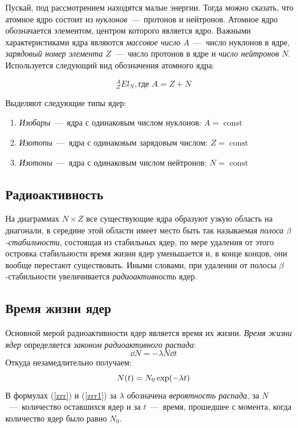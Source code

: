 \documentclass[titlepage]{article}
\DeclareMathOperator\const{const}
\begin{document}
\par
Пускай, под рассмотрением находятся малые энергии. Тогда можно сказать, что атомное ядро состоит из \emph{нуклонов}~\----~протонов и нейтронов. Атомное ядро обозначается элементом, центром которого является ядро. Важными характеристиками ядра являются \emph{массовое число} $A$~\----~число нуклонов в ядре, \emph{зарядовый номер элемента} $Z$~\----~число протонов в ядре и \emph{число нейтронов} $N$. Используется следующий вид обозначения атомного ядра:

\begin{equation}
 {}^{A}_{Z} El_N, \text{где } A = Z + N
\end{equation}

Выделяют следующие типы ядер:
\begin{enumerate}
 \item \emph{Изобары}~\----~ядра с одинаковым числом нуклонов:
 $
 A = \const
 $
 \item \emph{Изотопы}~\----~ядра с одинаковым зарядовым числом:
 $
 Z = \const
 $
 \item \emph{Изотоны}~\----~ядра с одинаковым числом нейтронов:
 $
 N = \const
 $
\end{enumerate}

\subsection{Радиоактивность}
На диаграммах $N \times Z$ все существующие ядра образуют узкую область на диагонали, в середине этой области имеет место быть так называемая \emph{полоса $\beta$\--стабильности}, состоящая из стабильных ядер, по мере удаления от этого островка стабильности время жизни ядер уменьшается и, в конце концов, они вообще перестают существовать. Иными словами, при удалении от полосы $\beta$\--стабильности увеличивается \emph{радиоактивность} ядер.

\subsection{Время жизни ядер}
Основной мерой радиоактивности ядер является время их жизни. \emph{Время жизни ядер} определяется \emph{законом радиоактивного распада}:
\begin{equation}\label{zrr}
 \dd N = -\lambda N \dd t
\end{equation}
Откуда незамедлительно получаем:
\begin{equation}\label{zrr1}
 N\qty(t) = N_0 \exp(-\lambda t)
\end{equation}
В формулах (\ref{zrr}) и (\ref{zrr1}) за $\lambda$ обозначена \emph{вероятность распада}, за $N$~\----~количество оставшихся ядер и за $t$~\----~время, прошедшее с момента, когда количество ядер было равно $N_0$.
\end{document}
